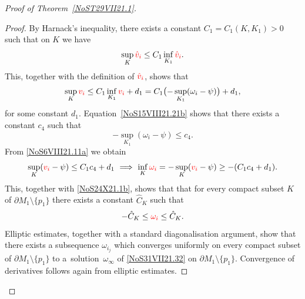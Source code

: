 \documentclass[10pt,a4paper]{article}
\numberwithin{equation}{section}
\newcommand{\mv}{\omega}%
\newcommand{\red}[1]{{\color{red}#1}}
\begin{document}
\begin{proof}[Proof of Theorem~\ref{NoST29VII21.1}]
\begin{proof}
By Harnack's inequality, there exists a constant $C_1= C_1(K,K_1) >0$ such that on $K$ we have
\begin{equation*}%
 \sup_K \red{\hat v_i} \le C_1 \inf_{K_1} \red{\hat v_i}.
\end{equation*}
This, together with the definition of $\red{\hat v_i}$, shows that
\begin{equation}\label{NoS6VIII21.11a}
 \sup_K \red{v_i} \le C_1 \inf_{K_1} \red{v_i} +d_1 =
 C_1 \big({-}\sup_{K_1}( {\mv_i}-\psi) \big) +d_1,
\end{equation}
for some constant $d_1$.
Equation~\eqref{NoS15VIII21.21b} shows that there exists a constant $c_4$ such that
\begin{equation*}%
- \sup_{K_1} (\mv_i -\psi)
 \le c_4.
\end{equation*}
From \eqref{NoS6VIII21.11a} we obtain
\begin{equation*}%
 \sup_K (\red{v_{i }}- \psi) \le C_1 c_4 +d_1
 \
 \Longrightarrow
 \
 \inf_K \red{\mv_{i }} = - \sup_K (\red{v_{i }}- \psi) \ge -(C_1 c_4 +d_1).
\end{equation*}
This, together with \eqref{NoS24X21.1b}, shows that
that for every compact subset $K$ of $\partial M_1\setminus \{p_1\}$
there exists a constant $\hat C_K$ such that
\begin{equation*}%
 - \hat C_K \le \red{\mv_{i }} \le \hat C_K.
\end{equation*}
Elliptic estimates, together with a standard diagonalisation argument, show that there exists a subsequence $\mv_{i_{j }}$ which
converges uniformly on every compact subset of $\partial M_1 \setminus \{p_1\}$ to a~solution~$\mv_\infty $
of \eqref{NoS31VII21.32} on $\partial M_1 \setminus \{p_1\}$. Convergence of derivatives follows again from elliptic estimates.
\end{proof}


\end{proof}
\end{document}
